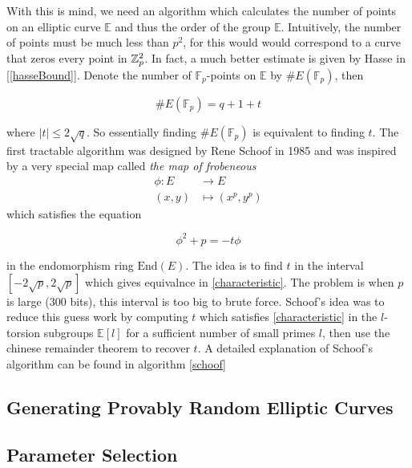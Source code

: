 With this is mind, we need an algorithm which calculates the number of points on an elliptic curve $\mathbb{E}$ and thus the order of the group $\mathbb{E}$. Intuitively, the number of points must be much less than $p^2$, for this would would correspond to a curve that zeros every point in $\mathbb{Z}_p^2$. In fact, a much better estimate is given by Hasse in [\ref{hasseBound}]. Denote the number of $\mathbb{F}_p$-points on $\mathbb{E}$ by $\# E(\mathbb{F}_p)$, then  

\begin{equation}
	\# E(\mathbb{F}_p) = q + 1 + t
\end{equation}

where $|t| \leq 2  \sqrt{q}$. So essentially finding $\# E(\mathbb{F}_p)$ is equivalent to finding $t$. The first tractable algorithm was designed by Rene Schoof in 1985 and was inspired by a very special map called \textit{the map of frobeneous}
\begin{align*}
	\phi : E &\rightarrow E \\
	(x,y) &\mapsto (x^p,y^p)
\end{align*}
which satisfies the equation 

\begin{equation} 
	\phi^2 + p = - t \phi \label{characteristic}
\end{equation} 

 in the endomorphism ring $\text{End}(E)$. The idea is to find $t$ in the interval $[-2 \sqrt{p},2 \sqrt{p}]$ which gives equivalnce in \eqref{characteristic}. The problem is when $p$ is large ($300$ bits), this interval is too big to brute force. Schoof's idea was to reduce this guess work by computing $t$ which satisfies \eqref{characteristic} in the $l$-torsion subgroups $\mathbb{E}[l]$ for a sufficient number of small primes $l$, then use the chinese remainder theorem to recover $t$. A detailed explanation of Schoof's algorithm can be found in algorithm \ref{schoof}

\subsection{Generating Provably Random Elliptic Curves}
\subsection{Parameter Selection}
